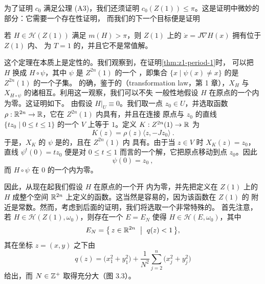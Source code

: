 为了证明 $c_{0}$ 满足\trNormalization{}公理 (A3)，我们还须证明%
$c_{0}(Z(1))\leq\pi$。这是证明中微妙的部分：它需要一个存在性证明，%
而我们的下一个目标便是证明

\begin{theorem}\label{thm:z1-period-1}
若 $H\in\mathcal{H}(Z(1))$ 满足 $m(H)>\pi$，则 $Z(1)$ 上的%
\trHamiltonianSystem{} $\dot{x}=J\nabla H(x)$ 拥有位于 $Z(1)$ 内、%
\trPeriodic{}为 $T=1$ 的\trPeriodicSolution，并且它不是常值解。
\end{theorem}

这个定理在本质上是定性的。我们观察到，在证明\cref{thm:z1-period-1}时，%
可以把 $H$ 换成 $H\circ\psi$，其中 $\psi$ 是 $Z^{2n}(1)$ 的一个%
\trCompactSupport{}\trSymplecticDiffeomorphism，即集合%
$\{x\mid\psi(x)\neq x\}$ 的\trClosure{}是 $Z^{2n}(1)$ 的一个\trCompact{}子集。%
的确，鉴于\trHamiltonianVectorField{}的\trTransformationLaw{}（transformation law，第 1 章），$X_H$ 与%
$X_{H\circ\psi}$ 的诸\trFlow{}相互\trConjugate。利用这一观察，我们可以不失%
一般性地假设 $H$ 在原点的一个\trNeighborhood{}内为零。这证明如下。%
由假设 $H|_{U}\equiv0$。我们取一点 $z_{0}\in U$，并选取\trSmooth{}函数%
$\rho:\mathbb{R}^{2n}\to\mathbb{R}$，它在 $Z^{2n}(1)$ 内具有\trCompactSupport，并且在连接%
原点与 $z_{0}$ 的直线 $\{tz_{0}\mid 0\leq t\leq1\}$ 的一个\trNeighborhood{}%
$V$ 上等于 $1$。定义\trHamiltonianFunction{} $K:Z^{2n}(1)\to\mathbb{R}$ 为
\[
K(z)=\rho(z)\langle z,-Jz_{0}\rangle\ .
\]
于是，$X_K$ 的\trTimeOneMap{} $\psi$ 是\trSymplectic{}的，且在 $Z^{2n}(1)$ 内%
具有\trCompactSupport。由于当 $z\in V$ 时 $X_K(z)=z_{0}$，直线%
$\psi^{t}(0)=tz_{0}$ 便是对 $0\leq t\leq1$ 而言的一个解，它把原点移动到点%
$z_{0}$。因此
\[
\psi(0)=z_{0}\ ,
\]
而\trHamiltonianFunction{} $H\circ\psi$ 在 $0$ 的一个\trNeighborhood{}内为零。

因此，从现在起我们假设\trHamiltonianFunction{} $H$ 在原点的一个开%
\trNeighborhood{}内为零，并先把定义在 $Z(1)$ 上的 $H$ \trContinuation{}成整个空间%
$\mathbb{R}^{2n}$ 上定义的函数。这当然是容易的，因为该函数在 $Z(1)$ 的\trBoundary{}%
附近是常数。然而，考虑到后面的证明，我们将选取一个非常特殊的\trContinuation。%
首先注意，若 $H\in\mathcal{H}(Z(1),\omega_{0})$，则存在一个\trEllipsoid{}%
$E=E_{N}$ 使得 $H\in\mathcal{H}(E,\omega_{0})$，其中
\[
E_{N}=\bigl\{\,z\in\R^{2n}\ \bigm|\ q(z)<1\,\bigr\},
\]
其在坐标 $z=(x,y)$ 之下由
\[
q(z)=\bigl(x_{1}^{2}+y_{1}^{2}\bigr)+\frac{1}{N^{2}}\sum_{j=2}^{n}%
\bigl(x_{j}^{2}+y_{j}^{2}\bigr)
\]
给出，而 $N\in\mathbb{Z}^{+}$ 取得充分大（图 3.3）。

